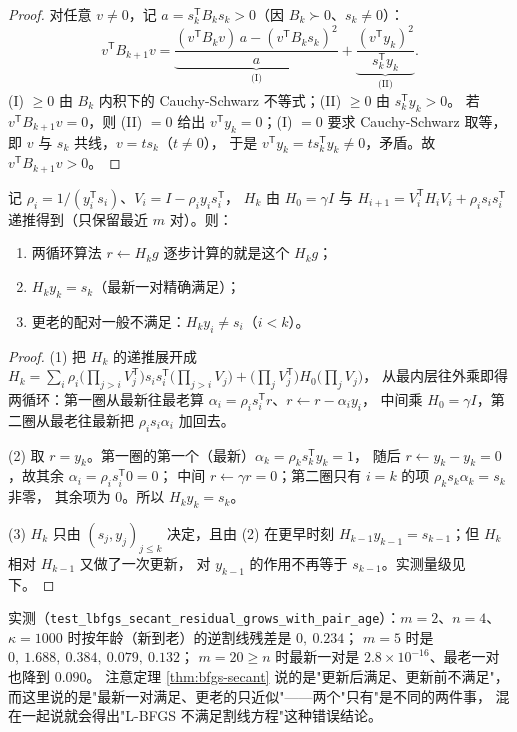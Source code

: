\begin{proof}
对任意 $v\ne0$，记 $a=s_k^{\mathsf T}B_ks_k>0$（因 $B_k\succ0$、$s_k\ne0$）：
\[
  v^{\mathsf T}B_{k+1}v
  =\underbrace{\frac{(v^{\mathsf T}B_kv)\,a-(v^{\mathsf T}B_ks_k)^2}{a}}_{\text{(I)}}
  +\underbrace{\frac{(v^{\mathsf T}y_k)^2}{s_k^{\mathsf T}y_k}}_{\text{(II)}} .
\]
(I) $\ge0$ 由 $B_k$ 内积下的 Cauchy-Schwarz 不等式；(II) $\ge0$ 由 $s_k^{\mathsf T}y_k>0$。
若 $v^{\mathsf T}B_{k+1}v=0$，则 (II) $=0$ 给出 $v^{\mathsf T}y_k=0$；(I) $=0$ 要求
Cauchy-Schwarz 取等，即 $v$ 与 $s_k$ 共线，$v=ts_k$（$t\ne0$），
于是 $v^{\mathsf T}y_k=ts_k^{\mathsf T}y_k\ne0$，矛盾。故 $v^{\mathsf T}B_{k+1}v>0$。
\end{proof}

\begin{theorem}
\label{thm:lbfgs}
记 $\rho_i=1/(y_i^{\mathsf T}s_i)$、$V_i=I-\rho_iy_is_i^{\mathsf T}$，
$H_k$ 由 $H_0=\gamma I$ 与 $H_{i+1}=V_i^{\mathsf T}H_iV_i+\rho_is_is_i^{\mathsf T}$
递推得到（只保留最近 $m$ 对）。则：
\begin{enumerate}
  \item 两循环算法 $r\gets H_kg$ 逐步计算的就是这个 $H_kg$；
  \item $H_ky_k=s_k$（最新一对精确满足）；
  \item 更老的配对一般不满足：$H_ky_i\ne s_i$（$i<k$）。
\end{enumerate}
\end{theorem}

\begin{proof}
(1) 把 $H_k$ 的递推展开成
$H_k=\sum_{i}\rho_i\bigl(\prod_{j>i}V_j^{\mathsf T}\bigr)s_is_i^{\mathsf T}
\bigl(\prod_{j>i}V_j\bigr)+\bigl(\prod_jV_j^{\mathsf T}\bigr)H_0
\bigl(\prod_jV_j\bigr)$，
从最内层往外乘即得两循环：第一圈从最新往最老算
$\alpha_i=\rho_is_i^{\mathsf T}r$、$r\gets r-\alpha_iy_i$，
中间乘 $H_0=\gamma I$，第二圈从最老往最新把 $\rho_is_i\alpha_i$ 加回去。

(2) 取 $r=y_k$。第一圈的第一个（最新）$\alpha_k=\rho_ks_k^{\mathsf T}y_k=1$，
随后 $r\gets y_k-y_k=0$，故其余 $\alpha_i=\rho_is_i^{\mathsf T}0=0$；
中间 $r\gets\gamma r=0$；第二圈只有 $i=k$ 的项 $\rho_ks_k\alpha_k=s_k$ 非零，
其余项为 $0$。所以 $H_ky_k=s_k$。

(3) $H_k$ 只由 $(s_j,y_j)_{j\le k}$ 决定，且由 (2) 在更早时刻
$H_{k-1}y_{k-1}=s_{k-1}$；但 $H_k$ 相对 $H_{k-1}$ 又做了一次更新，
对 $y_{k-1}$ 的作用不再等于 $s_{k-1}$。实测量级见下。
\end{proof}

实测（\texttt{test\_lbfgs\_secant\_residual\_grows\_with\_pair\_age}）：$m=2$、$n=4$、
$\kappa=1000$ 时按年龄（新到老）的逆割线残差是 $0,\ 0.234$；
$m=5$ 时是 $0,\ 1.688,\ 0.384,\ 0.079,\ 0.132$；
$m=20\ge n$ 时最新一对是 $2.8\times10^{-16}$、最老一对也降到 $0.090$。
注意定理 \ref{thm:bfgs-secant} 说的是"更新后满足、更新前不满足"，
而这里说的是"最新一对满足、更老的只近似"——两个"只有"是不同的两件事，
混在一起说就会得出"L-BFGS 不满足割线方程"这种错误结论。

